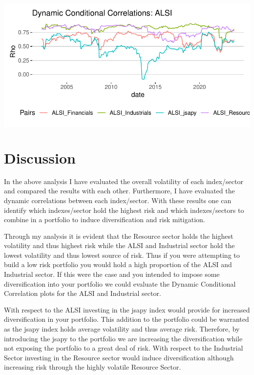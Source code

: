 \documentclass[12pt,preprint, authoryear]{elsarticle}
\let\origfigure\figure
\let\endorigfigure\endfigure
\renewenvironment{figure}[1][2] {
    \expandafter\origfigure\expandafter[H]
} {
    \endorigfigure
}
\numberwithin{equation}{section}
\numberwithin{figure}{section}
\numberwithin{table}{section}
\begin{document}
\begin{figure}[H]

{\centering \includegraphics{DCC_GARCH_22582053_files/figure-latex/Figure6-1} 

}

\caption{Dynamic Conditional Correlations: ALSI \label{Figure6}}\label{fig:Figure6}
\end{figure}

\hypertarget{discussion}{%
\section{\texorpdfstring{Discussion
\label{Discussion}}{Discussion }}\label{discussion}}

In the above analysis I have evaluated the overall volatility of each
index/sector and compared the results with each other. Furthermore, I
have evaluated the dynamic correlations between each index/sector. With
these results one can identify which indexes/sector hold the highest
risk and which indexes/sectors to combine in a portfolio to induce
diversification and risk mitigation.

Through my analysis it is evident that the Resource sector holds the
highest volatility and thus highest risk while the ALSI and Industrial
sector hold the lowest volatility and thus lowest source of risk. Thus
if you were attempting to build a low risk portfolio you would hold a
high proportion of the ALSI and Industrial sector. If this were the case
and you intended to impose some diversification into your portfolio we
could evaluate the Dynamic Conditional Correlation plots for the ALSI
and Industrial sector.

With respect to the ALSI investing in the jsapy index would provide for
increased diversification in your portfolio. This addition to the
portfolio could be warranted as the jsapy index holds average volatility
and thus average risk. Therefore, by introducing the jsapy to the
portfolio we are increasing the diversification while not exposing the
portfolio to a great deal of risk. With respect to the Industrial Sector
investing in the Resource sector would induce diversification although
increasing risk through the highly volatile Resource Sector.
\end{document}
